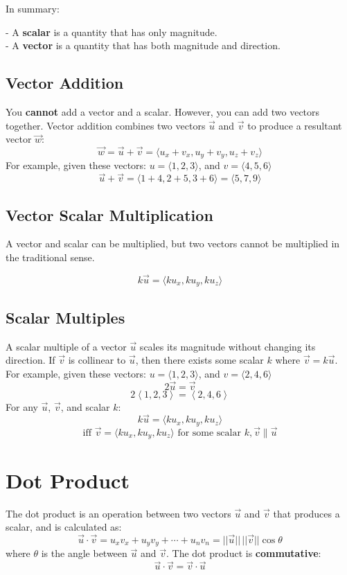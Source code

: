 \documentclass[a4paper,12pt,openany]{book}
\newcommand{\vcomponents}[4]{
    #1 = \langle #2, #3, #4 \rangle
}
\begin{document}
In summary:

- A \textbf{scalar} is a quantity that has only magnitude.\\
- A \textbf{vector} is a quantity that has both magnitude and direction.

\subsection{Vector Addition}
You \textbf{cannot} add a vector and a scalar. However, you can add two vectors together. Vector addition combines two vectors \(\vec{u}\) and \(\vec{v}\) to produce a resultant vector \(\vec{w}\):
\begin{equation}\label{Vector Addition}
    \vec{w} = \vec{u} + \vec{v} = \langle u_x + v_x, u_y + v_y, u_z + v_z \rangle
\end{equation}
For example, given these vectors: $\vcomponents{u}{1}{2}{3}$, and $\vcomponents{v}{4}{5}{6}$
\[
\vec{u} + \vec{v} = \langle 1 + 4, 2 + 5, 3 + 6 \rangle = \langle 5, 7, 9 \rangle
\]

\subsection{Vector Scalar Multiplication}
A vector and scalar can be multiplied, but two vectors cannot be multiplied in the traditional sense.

\begin{equation}\label{Vector Scalar Multiplication}
    k\vec{u} = \langle ku_x, ku_y, ku_z \rangle
\end{equation}


\subsection{Scalar Multiples}
A scalar multiple of a vector \(\vec{u}\) scales its magnitude without changing its direction. If \(\vec{v}\) is collinear to \(\vec{u}\), then there exists some scalar $k$ where \(\vec{v} = k\vec{u}\).
For example, given these vectors: $\vcomponents{u}{1}{2}{3}$, and $\vcomponents{v}{2}{4}{6}$
\[
2\vec{u} = \vec{v}
\]
\[
2\left\langle 1, 2, 3\right\rangle = 
\left\langle 2, 4, 6\right\rangle
\]
For any \(\vec{u}\), \(\vec{v}\), and scalar \(k\):
\[
k\vec{u} = \langle ku_x, ku_y, ku_z \rangle
\]
\[
    \text{iff } \vec{v} = \langle ku_x, ku_y, ku_z \rangle \text{ for some scalar } k, \vec{v} \parallel \vec{u}
\]


\section{Dot Product}
The dot product is an operation between two vectors \(\vec{u}\) and \(\vec{v}\) that produces a scalar, and is calculated as:
\begin{equation}\label{Dot Product}
    \vec{u} \cdot \vec{v} = u_x v_x + u_y v_y + \cdots + u_n v_n = ||\vec{u}|| \, ||\vec{v}|| \cos{\theta}
\end{equation}
where \(\theta\) is the angle between \(\vec{u}\) and \(\vec{v}\). The dot product is \textbf{commutative}:
\[
    \vec{u} \cdot \vec{v} = \vec{v} \cdot \vec{u}
\] 
\end{document}
